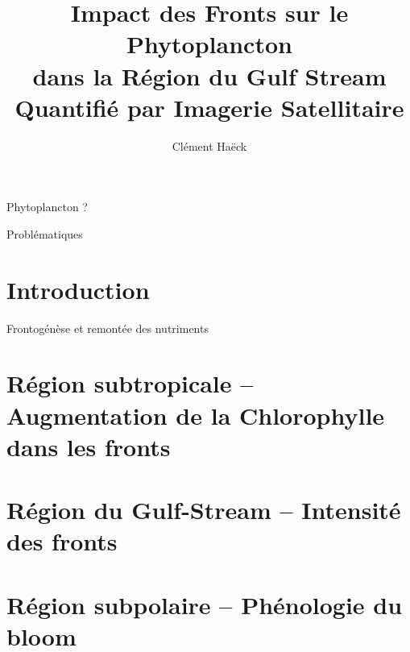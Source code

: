 \documentclass[11pt, french]{beamer}
\title{%
  Impact des Fronts sur le Phytoplancton\\
  dans la Région du Gulf Stream\\
  Quantifié par Imagerie Satellitaire
}
\author{Clément Haëck}
\institute{%
  Laboratoire d'Océanographie et du Climat\\Expérimentations et Analyses Numériques
}
\begin{document}
\begin{frame}
  \titlepage%
\end{frame}

\begin{frame}{Phytoplancton ?}
\end{frame}

\begin{frame}{Problématiques}
\end{frame}

\section{Introduction}

\begin{frame}{Frontogénèse et remontée des nutriments}
  \centering
\end{frame}

\section{Région subtropicale -- Augmentation de la Chlorophylle dans les fronts}

\section{Région du Gulf-Stream -- Intensité des fronts}

\section{Région subpolaire -- Phénologie du bloom}

\begin{frame}
\end{frame}
\end{document}
